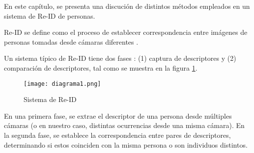 \documentclass[../memoria.tex]{subfiles}
\begin{document}
\label{marco teorico}

En este capítulo, se presenta una discución de distintos métodos empleados en un sistema de Re-ID de personas.

Re-ID se define como el proceso de establecer correspondencia entre imágenes de personas tomadas desde cámaras diferentes \cite{bedagkar2014survey}.



\indent Un sistema típico de Re-ID tiene dos fases \cite{bedagkar2014survey}: (1) captura de descriptores y (2) comparación de descriptores, tal como se muestra en la figura \ref{fig:sistemaReID}. %

\begin{figure}[h!]
  \centering
  \texttt{[image: diagrama1.png]}
  \caption{Sistema de Re-ID \cite{bedagkar2014survey}}
  \label{fig:sistemaReID}
\end{figure}

\indent En una primera fase, se extrae el descriptor de una persona desde múltiples cámaras (o en nuestro caso, distintas ocurrencias desde una misma cámara). En la segunda fase, se establece la correspondencia entre pares de descriptores, determinando si estos coinciden con la misma persona o son individuos distintos.
\end{document}
